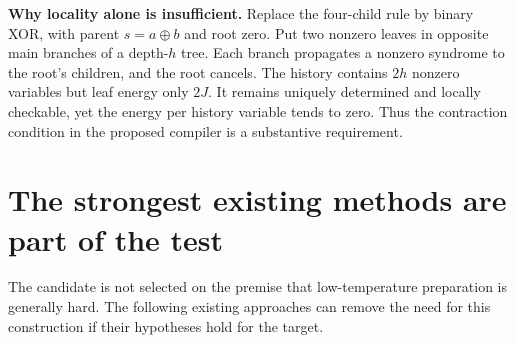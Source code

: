 \documentclass[11pt,a4paper]{article}
\begin{document}
\textbf{Why locality alone is insufficient.} Replace the four-child rule by binary XOR, with parent $s=a\oplus b$ and root zero. Put two nonzero leaves in opposite main branches of a depth-$h$ tree. Each branch propagates a nonzero syndrome to the root's children, and the root cancels. The history contains $2h$ nonzero variables but leaf energy only $2J$. It remains uniquely determined and locally checkable, yet the energy per history variable tends to zero. Thus the contraction condition in the proposed compiler is a substantive requirement.

\section{The strongest existing methods are part of the test}

The candidate is not selected on the premise that low-temperature preparation is generally hard. The following existing approaches can remove the need for this construction if their hypotheses hold for the target.
\end{document}
